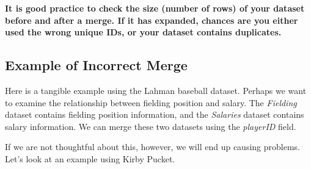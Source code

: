 \documentclass[]{book}
\theoremstyle{definition}
\theoremstyle{definition}
\theoremstyle{definition}
\theoremstyle{remark}
\begin{document}
\textbf{It is good practice to check the size (number of rows) of your
dataset before and after a merge. If it has expanded, chances are you
either used the wrong unique IDs, or your dataset contains duplicates.}

\hypertarget{example-of-incorrect-merge}{%
\subsection{Example of Incorrect
Merge}\label{example-of-incorrect-merge}}

Here is a tangible example using the Lahman baseball dataset. Perhaps we
want to examine the relationship between fielding position and salary.
The \emph{Fielding} dataset contains fielding position information, and
the \emph{Salaries} dataset contains salary information. We can merge
these two datasets using the \emph{playerID} field.

If we are not thoughtful about this, however, we will end up causing
problems. Let's look at an example using Kirby Pucket.
\end{document}
